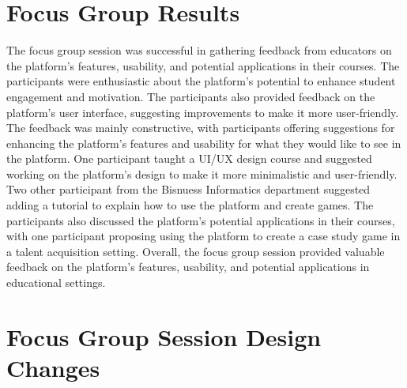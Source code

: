 \section{Focus Group Results}

The focus group session was successful in gathering feedback from educators on the platform's features, usability, and potential applications in their courses. The participants were enthusiastic about the platform's potential to enhance student engagement and motivation. The participants also provided feedback on the platform's user interface, suggesting improvements to make it more user-friendly. The feedback was mainly constructive, with participants offering suggestions for enhancing the platform's features and usability for what they would like to see in the platform. One participant taught a UI/UX design course and suggested working on the platform's design to make it more minimalistic and user-friendly. Two other participant from the Bisnuess Informatics department suggested adding a tutorial to explain how to use the platform and create games. The participants also discussed the platform's potential applications in their courses, with one participant proposing using the platform to create a case study game in a talent acquisition setting. Overall, the focus group session provided valuable feedback on the platform's features, usability, and potential applications in educational settings.

\section{Focus Group Session Design Changes}



